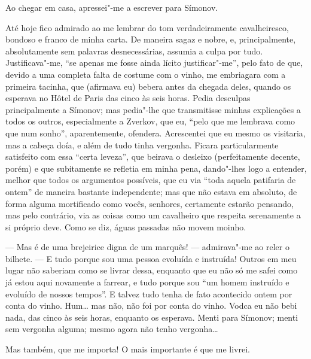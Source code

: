 Ao chegar em casa, apressei"-me a escrever para Símonov.

Até hoje fico admirado ao me lembrar do tom verdadeiramente
cavalheiresco, bondoso e franco de minha carta. De maneira sagaz e
nobre, e, principalmente, absolutamente sem palavras desnecessárias,
assumia a culpa por tudo. Justificava"-me, “se apenas me fosse ainda
lícito justificar"-me”, pelo fato de que, devido a uma completa falta de
costume com o vinho, me embriagara com a primeira tacinha, que
(afirmava eu) bebera antes da chegada deles, quando os esperava no
Hôtel de Paris das cinco às seis horas. Pedia desculpas
principalmente a Símonov; mas pedia"-lhe que transmitisse minhas
explicações a todos os outros, especialmente a Zverkov, que eu, “pelo
que me lembrava como que num sonho”, aparentemente, ofendera.
Acrescentei que eu mesmo os visitaria, mas a cabeça doía, e além de
tudo tinha vergonha. Ficara particularmente satisfeito com essa “certa
leveza”, que beirava o desleixo (perfeitamente decente, porém) e que
subitamente se refletia em minha pena, dando"-lhes logo a entender,
melhor que todos os argumentos possíveis, que eu via “toda aquela
patifaria de ontem” de maneira bastante independente; mas que não
estava em absoluto, de forma alguma mortificado como vocês, senhores,
certamente estarão pensando, mas pelo contrário, via as coisas como um
cavalheiro que respeita serenamente a si próprio deve. Como se diz,
águas passadas não movem moinho.

--- Mas é de uma brejeirice digna de um marquês! --- admirava"-me ao reler o
bilhete. --- E tudo porque sou uma pessoa evoluída e instruída! Outros em
meu lugar não saberiam como se livrar dessa, enquanto que eu não só me
safei como já estou aqui novamente a farrear, e tudo porque sou “um
homem instruído e evoluído de nossos tempos”. E talvez tudo tenha de
fato acontecido ontem por conta do vinho. Hum\ldots{} mas não, não foi por
conta do vinho. Vodca eu não bebi nada, das cinco às seis horas,
enquanto os esperava. Menti para Símonov; menti sem vergonha alguma;
mesmo agora não tenho vergonha\ldots{}

Mas também, que me importa! O mais importante é que me livrei.

